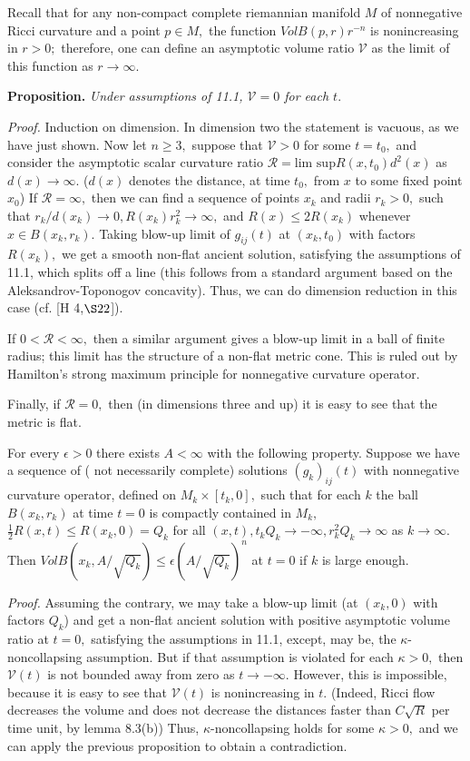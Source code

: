 \documentclass[12pt]{article}
\newcommand{\cV}{\mathcal{V}}
\newcommand{\cR}{\mathcal{R}}
\newcommand{\e}{\epsilon}
\theoremstyle{plain}
{\swapnumbers
\newtheorem{thm}{Theorem}[section]
\newtheorem{cor}[thm]{Corollary}
\newtheorem{lem}[thm]{Lemma}
\newtheorem{prop}[thm]{Proposition}
}
\theoremstyle{definition}
{\swapnumbers
\newtheorem{defn}[thm]{Definition}
\newtheorem{nota}[thm]{Notation}
\newtheorem{parag}[thm]{}
\newtheorem*{parstr}{\addtocounter{thm}{1}\thesection.\arabic{thm}*}
\newtheorem*{intropar}{\addtocounter{thm}{1}\arabic{thm}}
}
\theoremstyle{remark} {\swapnumbers
\newtheorem{rem}[thm]{Remark}
\newtheorem{exam}[thm]{Example}
\newtheorem{lemma}[thm]{Lemma}
\newtheorem{claim}[thm]{Claim}
}
\numberwithin{equation}{section}
\begin{document}
  \begin{parag} Recall that for any non-compact complete riemannian
  manifold $M$ of nonnegative Ricci curvature and a point $p\in
  M,$ the function $VolB(p,r)r^{-n}$ is nonincreasing in $r>0;$
  therefore, one can define an asymptotic volume ratio $\cV$ as
  the limit of this function as $r\to\infty.$ \par{\bf
  Proposition.}{\it
  Under assumptions of 11.1, $\cV=0$ for each $t.$} \par {\it Proof.}  Induction on dimension. In
  dimension two the statement is vacuous, as we have just shown.
  Now let $n\ge 3,$  suppose that $\cV>0$ for some $t=t_0,$ and
  consider the asymptotic scalar curvature ratio $\cR=\mbox{lim
  sup}R(x,t_0)d^2(x)$ as $d(x)\to\infty.$ ($d(x)$ denotes
  the distance, at time $t_0,$ from $x$ to some fixed point $x_0$)
  If $\cR=\infty,$ then we can find a sequence of points $x_k$ and
  radii $r_k>0,$ such that $r_k/d(x_k)\to 0,
  R(x_k)r_k^2\to\infty , $ and $R(x)\le 2R(x_k)$ whenever $x\in
  B(x_k,r_k).$  Taking blow-up limit of $g_{ij}(t)$ at $(x_k,t_0)$
  with factors $R(x_k),$ we get a smooth non-flat ancient
  solution, satisfying the assumptions of 11.1, which splits off a
  line (this follows from a standard argument based on the
  Aleksandrov-Toponogov concavity). Thus, we can do dimension
  reduction in this case (cf. [H 4,$\S 22$]). \par If $0<\cR <\infty ,$
  then a similar argument gives a blow-up limit in a ball of
  finite radius; this limit has the structure of a non-flat metric
  cone. This is ruled out by Hamilton's strong maximum principle for
  nonnegative curvature operator. \par
  Finally, if $\cR =0,$ then (in dimensions three and up) it is easy to see that
  the metric is flat. \end{parag} \begin{cor} For every $\e>0$ there
  exists $A< \infty $ with the following property. Suppose we have a
  sequence of ( not necessarily complete) solutions $(g_k)_{ij}(t)$ with
  nonnegative curvature operator, defined on $M_k\times[t_k,0],$
  such that for each $k$ the ball $B(x_k,r_k)$ at time $t=0$ is
  compactly contained in $M_k,$  $\frac{1}{2}R(x,t)\le R(x_k,0)=Q_k$ for all
  $(x,t), t_kQ_k\to -\infty , r_k^2Q_k\to\infty$ as $k\to\infty.$ Then $VolB(x_k,A/\sqrt{Q_k})\le\e(A/\sqrt{Q_k})^n$ at
  $t=0$ if $k$ is large enough.\end{cor} {\it Proof. } Assuming the contrary,
  we may take a blow-up limit (at $(x_k,0)$ with factors $Q_k$)
  and get a non-flat ancient solution with positive asymptotic
  volume ratio at $t=0,$ satisfying the assumptions in 11.1,
  except, may be, the $\kappa$-noncollapsing assumption. But if
  that assumption is violated for each $\kappa>0,$ then $\cV(t)$ is
  not bounded away from zero as $t\to -\infty.$ However, this is
  impossible, because it is easy to see that $\cV(t)$ is
  nonincreasing in $t.$ (Indeed, Ricci flow decreases the volume
  and does not decrease the distances faster than $C\sqrt{R}$ per
  time unit, by  lemma 8.3(b)) Thus,
  $\kappa$-noncollapsing holds for some $\kappa>0,$ and we can
  apply the previous proposition to obtain a contradiction.
\end{document}
